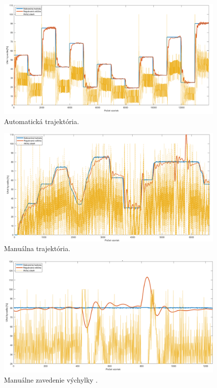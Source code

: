 \begin{figure}[!tbh]
	\centering
	\includegraphics[width=150mm]{obr/Auto3.png}
	\caption{Automatická trajektória.}\label{OBRAZOK 2.5.2}
\end{figure}
\begin{figure}[!tbh]
	\centering
	\includegraphics[width=150mm]{obr/potentio.png}
	\caption{Manuálna trajektória.}\label{OBRAZOK 2.5.3}
\end{figure}

\begin{figure}[!tbh]
	\centering
	\includegraphics[width=\textwidth]{obr/BuchnutieKyvadla.png}
	\caption{Manuálne zavedenie výchylky .}\label{OBRAZOK 2.5.4}
\end{figure}


